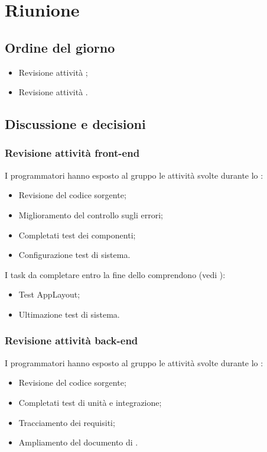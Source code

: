 \section{Riunione}
\subsection{Ordine del giorno}
\begin{itemize}
	\item Revisione attività ;
	\item Revisione attività .
\end{itemize}

\subsection{Discussione e decisioni}
\subsubsection{Revisione attività front-end}
\par I programmatori  hanno esposto al gruppo le attività svolte durante lo :
\begin{itemize}
	\item Revisione del codice sorgente;
	\item Miglioramento del controllo sugli errori;
	\item Completati test dei componenti;
	\item Configurazione test di sistema.
\end{itemize}

\vspace{0.5\baselineskip}
\par I task da completare entro la fine dello  comprendono (vedi ):
\begin{itemize}
	\item Test  AppLayout;
	\item Ultimazione test di sistema.
\end{itemize}

\subsubsection{Revisione attività back-end}
\par I programmatori  hanno esposto al gruppo le attività svolte durante lo :
\begin{itemize}
	\item Revisione del codice sorgente;
	\item Completati test di unità e integrazione;
	\item Tracciamento dei requisiti;
	\item Ampliamento del documento di \ST.
\end{itemize}

